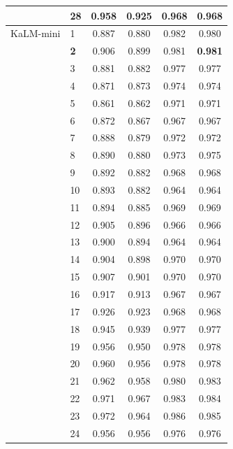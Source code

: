 \begin{longtable}{llcccc}
 & 28 & 0.958 & 0.925 & 0.968 & 0.968 \\
\midrule
KaLM-mini & 1 & 0.887 & 0.880 & 0.982 & 0.980 \\
 & \textbf{2} & 0.906 & 0.899 & 0.981 & \textbf{0.981} \\
 & 3 & 0.881 & 0.882 & 0.977 & 0.977 \\
 & 4 & 0.871 & 0.873 & 0.974 & 0.974 \\
 & 5 & 0.861 & 0.862 & 0.971 & 0.971 \\
 & 6 & 0.872 & 0.867 & 0.967 & 0.967 \\
 & 7 & 0.888 & 0.879 & 0.972 & 0.972 \\
 & 8 & 0.890 & 0.880 & 0.973 & 0.975 \\
 & 9 & 0.892 & 0.882 & 0.968 & 0.968 \\
 & 10 & 0.893 & 0.882 & 0.964 & 0.964 \\
 & 11 & 0.894 & 0.885 & 0.969 & 0.969 \\
 & 12 & 0.905 & 0.896 & 0.966 & 0.966 \\
 & 13 & 0.900 & 0.894 & 0.964 & 0.964 \\
 & 14 & 0.904 & 0.898 & 0.970 & 0.970 \\
 & 15 & 0.907 & 0.901 & 0.970 & 0.970 \\
 & 16 & 0.917 & 0.913 & 0.967 & 0.967 \\
 & 17 & 0.926 & 0.923 & 0.968 & 0.968 \\
 & 18 & 0.945 & 0.939 & 0.977 & 0.977 \\
 & 19 & 0.956 & 0.950 & 0.978 & 0.978 \\
 & 20 & 0.960 & 0.956 & 0.978 & 0.978 \\
 & 21 & 0.962 & 0.958 & 0.980 & 0.983 \\
 & 22 & 0.971 & 0.967 & 0.983 & 0.984 \\
 & 23 & 0.972 & 0.964 & 0.986 & 0.985 \\
 & 24 & 0.956 & 0.956 & 0.976 & 0.976 \\
\end{longtable}
\endgroup
